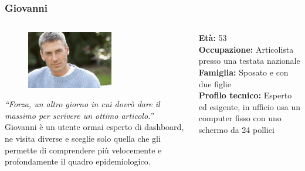 \documentclass[handout]{beamer}
\begin{document}
		\begin{frame}
			\frametitle{Giovanni}
			\begin{columns}[t]
				\begin{column}[T]{5cm}
					\begin{figure}
						\centering
						\vspace{-10pt}
						\includegraphics[height=2.5cm]{img/giovanni}
					\end{figure}
					\vspace{-10pt}
					\textit{``Forza, un altro giorno in cui dovrò dare il massimo per scrivere un ottimo articolo.''}\\
					Giovanni è un utente ormai esperto di dashboard, ne visita diverse e sceglie solo quella che gli permette di comprendere più velocemente e profondamente il quadro epidemiologico.
				\end{column}
				\begin{column}[T]{5cm}
					\textbf{Età:} 53\\
					\textbf{Occupazione:} Articolista presso una testata nazionale\\
					\textbf{Famiglia:} Sposato e con due figlie\\
					\textbf{Profilo tecnico:} Esperto ed esigente, in ufficio usa un computer fisso con uno schermo da 24 pollici\\
				\end{column}
			\end{columns}
		\end{frame}
\end{document}
